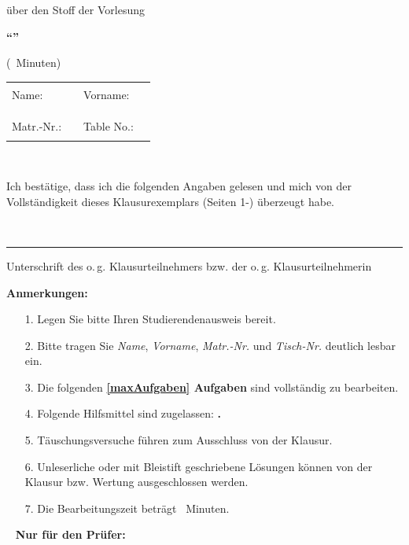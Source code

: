 \enlargethispage{3em}
{


{\Large
\begin{center}
 über den Stoff der Vorlesung
	
	\textbf{"`\klausurname"'}
	
	(\klausurminuten\ Minuten)
\end{center}
}

{\large
\vspace{1cm}
\begin{tabular}{llll}
Name: & \rule{5cm}{1pt} & Vorname: & \rule{5cm}{1pt}\\
&&& \\
Matr.-Nr.: & \rule{5cm}{1pt} & Table No.: & \rule{4.5cm}{1pt}
\end{tabular}
}

~\vspace{0.0cm}

Ich bestätige, dass ich die folgenden Angaben gelesen und mich von der Vollständigkeit dieses Klausurexemplars (Seiten 1-\pageref{LastPage}) überzeugt habe.

~\vspace{0.5cm}

\begin{flushright}
\begin{minipage}{7.5cm}
\rule{\textwidth}{0.5pt}
Unterschrift des o.\,g. Klausur\-teil\-nehmers bzw. der o.\,g. Klausurteilnehmerin
\end{minipage}
\end{flushright}

\textbf{Anmerkungen:}

\begin{itemize}
	\item[1.] Legen Sie bitte Ihren Studierendenausweis bereit.
	\item[2.] Bitte tragen Sie \emph{Name}, \emph{Vorname}, \emph{Matr.-Nr.} und \emph{Tisch-Nr.} deutlich lesbar ein.
	\item[3.] Die folgenden \textbf{\ref{maxAufgaben} Aufgaben} sind vollständig zu bearbeiten.
	\item[4.] Folgende Hilfsmittel sind zugelassen: \textbf{\klausurhilfsmittel.}
	\item[5.] Täuschungsversuche führen zum Ausschluss von der Klausur.
	\item[6.] Unleserliche oder mit Bleistift geschriebene Lösungen können von der Klausur bzw. Wertung ausgeschlossen werden.
	\item[7.] Die Bearbeitungszeit beträgt \klausurminuten\ Minuten.
\end{itemize}
~
\smallbreak
{\footnotesize
\textbf{Nur für den Prüfer:}
}


}
